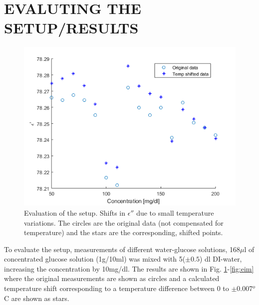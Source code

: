 \documentclass[10pt,final,conference,a4paper,twocolumn]{IEEEtran_AntennEMB_GigaHertz2016}
\begin{document}

\section{EVALUTING THE SETUP/RESULTS}
 \begin{figure}[b]
	\centering
	\includegraphics[width=1.0\columnwidth]{pumpgluzoomERE.png}
	\caption{Evaluation of the setup. Shifts in $\epsilon''$ due to small temperature variations. The circles are the original data (not compensated for temperature) and the stars are the corresponding, shifted points.}
	\label{fig:ere}
\end{figure}
To evaluate the setup, measurements of different water-glucose solutions, 168$\mu$l of concentrated glucose solution (1g/10ml) was mixed with 5($\pm0.5$) dl DI-water, increasing the concentration by 10mg/dl. The results are shown in Fig. \ref{fig:ere}-\ref{fig:eim} where the original measurements are shown as circles and a calculated temperature shift corresponding to a temperature difference between 0 to $\pm$0.007$^o$C are shown as stars.
\end{document}
